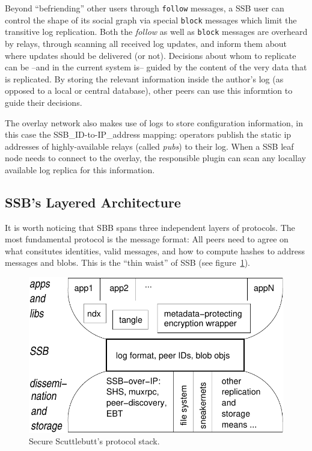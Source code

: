 \documentclass[10pt,sigconf]{acmart}
\begin{document}
Beyond ``befriending'' other users through {\tt follow} messages, a SSB user can control the shape of its social graph via special {\tt block} messages which limit the transitive log replication. Both the {\em follow} as well as {\tt block} messages are overheard by relays, through scanning all received log updates, and inform them about where updates should be delivered (or not). Decisions about whom to replicate can be --and in the current system is-- guided by the content of the very data that is replicated. By storing the relevant information inside the author's log (as opposed to a local or central database), other peers can use this informtion to guide their decisions.

The overlay network also makes use of logs to store configuration information, in this case the SSB\_ID-to-IP\_address mapping: operators publish the static ip addresses of highly-available relays (called {\em pubs}) to their log. When a SSB leaf node needs to connect to the overlay, the responsible plugin can scan any locallay available log replica for this information.

\subsection*{SSB's Layered Architecture}

It is worth noticing that SBB spans three independent layers of protocols. The most fundamental protocol is the message format: All peers need to agree on what consitutes identities, valid messages, and how to compute hashes to address messages and blobs. This is the ``thin waist'' of SSB (see figure~\ref{fig:waist}).

\begin{figure}[htb]
  \includegraphics[width=0.9\columnwidth]{figs/ssb-waist.pdf}
  \caption{Secure Scuttlebutt's protocol stack.}
  \label{fig:waist}
\end{figure}
\end{document}
